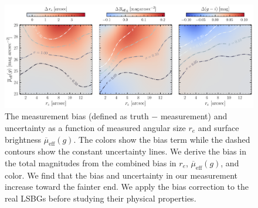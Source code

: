 \documentclass[twocolumn,astrosymb,twocolappendix,linenumbers]{aastex631}
\newcommand{\sbeff}{\overline{\mu}_{\mathrm{eff}}(g)}
\begin{document}
\begin{CJK*}{UTF8}{gbsn}
\begin{figure}
	\vbox{ 
		\centering
		\includegraphics[width=1\linewidth]{meas_error_spergel.pdf}
	}
    \caption{The measurement bias (defined as truth $-$ measurement) and uncertainty as a function of measured angular size $r_e$ and surface brightness $\sbeff$. The colors show the bias term while the dashed contours show the constant uncertainty lines. We derive the bias in the total magnitudes from the combined bias in $r_e$, $\sbeff$, and color. We find that the bias and uncertainty in our measurement increase toward the fainter end. We apply the bias correction to the real LSBGs before studying their physical properties.}
    \label{fig:meas_err}
\end{figure}

\vspace{1em}


\end{CJK*}
\end{document}
